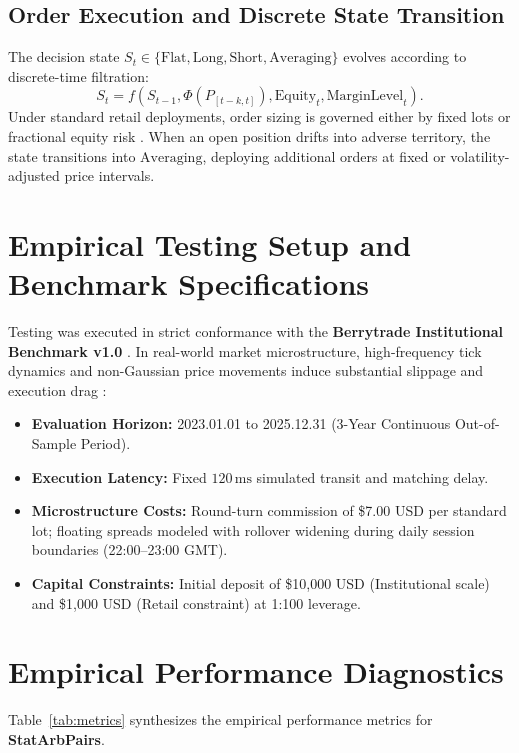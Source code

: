 \documentclass[11pt,a4paper]{article}
\begin{document}
\subsection{Order Execution and Discrete State Transition}
The decision state $S_t \in \{\text{Flat}, \text{Long}, \text{Short}, \text{Averaging}\}$ evolves according to discrete-time filtration:
\begin{equation}
S_{t} = f(S_{t-1}, \Phi(P_{[t-k, t]}), \text{Equity}_t, \text{MarginLevel}_t).
\end{equation}
Under standard retail deployments, order sizing is governed either by fixed lots or fractional equity risk \cite{lopez2018advances, carhart1997persistence}. When an open position drifts into adverse territory, the state transitions into $\text{Averaging}$, deploying additional orders at fixed or volatility-adjusted price intervals.

\section{Empirical Testing Setup and Benchmark Specifications}
Testing was executed in strict conformance with the \textbf{Berrytrade Institutional Benchmark v1.0} \cite{artsu2026illusion}. In real-world market microstructure, high-frequency tick dynamics and non-Gaussian price movements induce substantial slippage and execution drag \cite{kyle1985continuous, amihud2002illiquidity, cont2001empirical, mandelbrot1963variation}:
\begin{itemize}
    \item \textbf{Evaluation Horizon:} 2023.01.01 to 2025.12.31 (3-Year Continuous Out-of-Sample Period).
    \item \textbf{Execution Latency:} Fixed $120\,\text{ms}$ simulated transit and matching delay.
    \item \textbf{Microstructure Costs:} Round-turn commission of \$7.00 USD per standard lot; floating spreads modeled with rollover widening during daily session boundaries (22:00--23:00 GMT).
    \item \textbf{Capital Constraints:} Initial deposit of \$10,000 USD (Institutional scale) and \$1,000 USD (Retail constraint) at 1:100 leverage.
\end{itemize}

\section{Empirical Performance Diagnostics}
Table~\ref{tab:metrics} synthesizes the empirical performance metrics for \textbf{StatArbPairs}.
\end{document}
